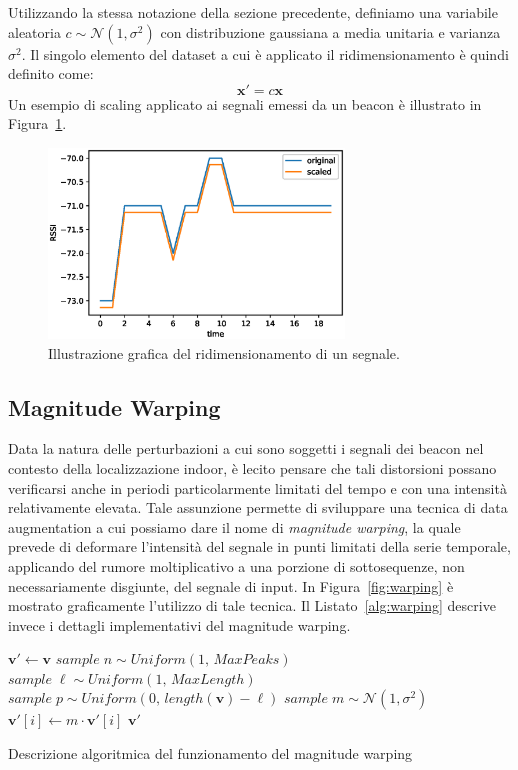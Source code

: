 Utilizzando la stessa notazione della sezione precedente, definiamo una
variabile aleatoria \(c \sim \mathcal{N}(1, \sigma^2)\) con distribuzione
gaussiana a media unitaria e varianza \(\sigma^2\). Il singolo elemento del
dataset a cui è applicato il ridimensionamento è quindi definito come:
\[ \bm x' = c \bm x \] 
Un esempio di scaling applicato ai segnali emessi da un beacon è illustrato in
Figura~\ref{fig:scaling}.
\begin{figure}[!htp]
  \centering\includegraphics[width=0.7\textwidth]{./img/scaling.eps}
  \caption{Illustrazione grafica del ridimensionamento di un segnale.}%
  \label{fig:scaling}%
\end{figure}

\subsection{Magnitude Warping}
Data la natura delle perturbazioni a cui sono soggetti i segnali dei beacon nel
contesto della localizzazione indoor, è lecito pensare che tali distorsioni
possano verificarsi anche in periodi particolarmente limitati del tempo e con
una intensità relativamente elevata. Tale assunzione permette di sviluppare una
tecnica di data augmentation a cui possiamo dare il nome di \emph{magnitude
  warping}, la quale prevede di deformare l'intensità del segnale in punti
limitati della serie temporale, applicando del rumore moltiplicativo a una
porzione di sottosequenze, non necessariamente disgiunte, del segnale di input.
In Figura~\ref{fig:warping} è mostrato graficamente l'utilizzo di tale tecnica.
Il Listato~\ref{alg:warping} descrive invece i dettagli implementativi del
magnitude warping.
\begin{algorithm}%
  \begin{algorithmic}
      \State $\bm v' \gets \bm v$
      \State $sample\; n \sim \mathit{Uniform}(1,\, \mathit{MaxPeaks})$
        \State $sample\; \ell \sim \mathit{Uniform}(1,\, \mathit{MaxLength})$
        \State $sample\; p \sim \mathit{Uniform}(0,\, length(\bm v) - \ell)$
        \State $sample\; m \sim \mathcal{N}(1, \sigma^2)$
        \State $\bm v'[i] \gets m \cdot \bm v'[i]$
        \EndFor
      \EndFor
      \Return $\bm v'$
    \EndFunction
  \end{algorithmic}
  \caption{Descrizione algoritmica del funzionamento del magnitude warping}
  \label{alg:warping}
\end{algorithm}

